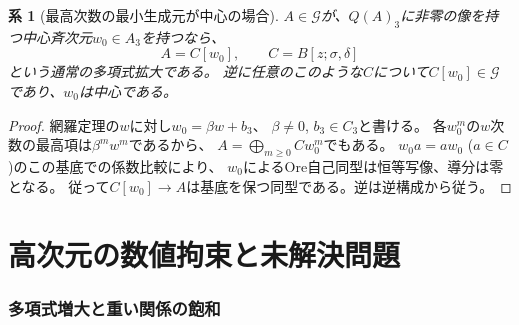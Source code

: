 \documentclass[11pt,a4paper]{ltjsarticle}
\newtheorem{corollary}[theorem]{系}
\theoremstyle{definition}
\newcommand{\Gclass}{\mathcal G}
\begin{document}
\begin{corollary}[最高次数の最小生成元が中心の場合]\label{spec:cor:central-generator}
$A\in\Gclass$が、$Q(A)_3$に非零の像を持つ中心斉次元$w_0\in A_3$を持つなら、
\[
A=C[w_0],\qquad C=B[z;\sigma,\delta]
\]
という通常の多項式拡大である。
逆に任意のこのような$C$について$C[w_0]\in\Gclass$であり、$w_0$は中心である。
\end{corollary}
\begin{proof}
網羅定理の$w$に対し$w_0=\beta w+b_3$、
$\beta\ne0$, $b_3\in C_3$と書ける。
各$w_0^m$の$w$次数の最高項は$\beta^m w^m$であるから、
$A=\bigoplus_{m\geq0}Cw_0^m$でもある。
$w_0a=aw_0$ ($a\in C$)のこの基底での係数比較により、
$w_0$によるOre自己同型は恒等写像、導分は零となる。
従って$C[w_0]\to A$は基底を保つ同型である。逆は逆構成から従う。
\end{proof}
\clearpage

\clearpage
\part{高次元の数値拘束と未解決問題}\label{part:highdim}

\section{多項式増大と重い関係の飽和}\label{sec:heavy-growth}
\end{document}
